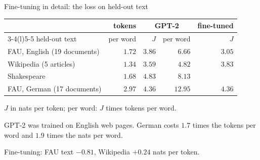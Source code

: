 \documentclass[10pt]{beamer}
\begin{document}
\begin{frame}{Fine-tuning in detail: the loss on held-out text}
\small
\centering
\renewcommand{\arraystretch}{1.12}
\begin{tabular}{@{}l r r r r@{}}
\toprule
 & tokens & \multicolumn{2}{c}{GPT-2} & fine-tuned \\
\cmidrule(lr){3-4}\cmidrule(l){5-5}
held-out text & per word & $J$ & per word & $J$ \\
\midrule
FAU, English (19 documents) & $1.72$ & $3.86$ & $6.66$ & \alert{$3.05$} \\
Wikipedia (5 articles) & $1.34$ & $3.59$ & $4.82$ & $3.83$ \\
Shakespeare & $1.68$ & $4.83$ & $8.13$ & \\
FAU, German (17 documents) & $2.97$ & $4.36$ & $12.95$ & $4.36$ \\
\bottomrule
\end{tabular}\par

\medskip
\raggedright
$J$ in nats per token; per word: $J$ times tokens per word.

\medskip
GPT-2 was trained on English web pages.\footnotemark{} German costs $1.7$ times the tokens per word and $1.9$ times the nats per word.

\medskip
\alert{Fine-tuning}: FAU text $-0.81$, Wikipedia $+0.24$ nats per token.
\end{frame}
\end{document}
